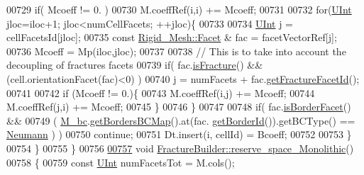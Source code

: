 \begin{DoxyCode}
00729             \textcolor{keywordflow}{if}( Mcoeff != 0. )
00730                 M.coeffRef(i,i) += Mcoeff;
00731 
00732             \textcolor{keywordflow}{for}(\hyperlink{namespaceFVCode3D_a4bf7e328c75d0fd504050d040ebe9eda}{UInt} jloc=iloc+1; jloc<numCellFacets; ++jloc)\{
00733 
00734                 \hyperlink{namespaceFVCode3D_a4bf7e328c75d0fd504050d040ebe9eda}{UInt} j = cellFacetsId[jloc];
00735                 \textcolor{keyword}{const} \hyperlink{classFVCode3D_1_1Rigid__Mesh_1_1Facet}{Rigid\_Mesh::Facet} & fac = facetVectorRef[j];
00736                 Mcoeff = Mp(iloc,jloc);
00737                 
00738                 \textcolor{comment}{// This is to take into account the decoupling of fractures facets}
00739                                 \textcolor{keywordflow}{if}( fac.\hyperlink{classFVCode3D_1_1Rigid__Mesh_1_1Facet_aed3f579d52847e839501f647e90c35ab}{isFracture}() && (cell.orientationFacet(fac)<0) )
00740                                         j = numFacets + fac.\hyperlink{classFVCode3D_1_1Rigid__Mesh_1_1Facet_a08dc369eccd02b29133187cede7511eb}{getFractureFacetId}();
00741 
00742                 \textcolor{keywordflow}{if} (Mcoeff != 0.)\{
00743                     M.coeffRef(i,j) += Mcoeff;
00744                     M.coeffRef(j,i) += Mcoeff;
00745                 \} 
00746             \}
00747             
00748                         \textcolor{keywordflow}{if}( fac.\hyperlink{classFVCode3D_1_1Rigid__Mesh_1_1Facet_af84dc398fca7867ff763bfca119ddc16}{isBorderFacet}() &&
00749                                 ( \hyperlink{classFVCode3D_1_1global__InnerProduct_a62bbb87bc4710a73980603b8b77ffda8}{M\_bc}.\hyperlink{classFVCode3D_1_1BoundaryConditions_a5b53a81bdab88709fae14892bfe6a7c9}{getBordersBCMap}().at(fac.
      \hyperlink{classFVCode3D_1_1Rigid__Mesh_1_1Facet_a528828e73f43ae6fa5c858ecc5ab5a65}{getBorderId}()).getBCType() == \hyperlink{namespaceFVCode3D_a73660061f11f1671164ce171a053f8c5a30212425b27314b01b40f4984dbf850a}{Neumann} ) )
00750                                 \textcolor{keywordflow}{continue};
00751                         Dt.insert(i, cellId) = Bcoeff;
00752                                 
00753                 \}
00754         \}
00755 \}
00756 
\hypertarget{global__operator_8cpp_source.tex_l00757}{}\hyperlink{classFVCode3D_1_1FractureBuilder_af3f7ade53f75d44dbb523b697bced516}{00757} \textcolor{keywordtype}{void} \hyperlink{classFVCode3D_1_1FractureBuilder_af3f7ade53f75d44dbb523b697bced516}{FractureBuilder::reserve\_space\_Monolithic}()
00758 \{
00759         \textcolor{keyword}{const} \hyperlink{namespaceFVCode3D_a4bf7e328c75d0fd504050d040ebe9eda}{UInt} numFacetsTot = M.cols();

\end{DoxyCode}
